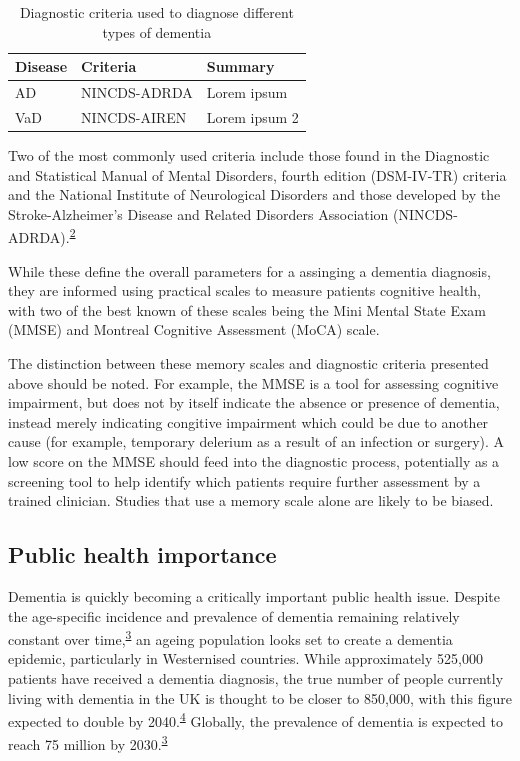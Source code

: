 \documentclass[a4paper, twoside]{templates/ociamthesis}
\begin{document}
\begin{table}[!h]

\caption{\label{tab:diagnosticCriteria-table}Diagnostic criteria used to diagnose different types of dementia}
\centering
\begin{tabular}[t]{lll}
\toprule
Disease & Criteria & Summary\\
\midrule
AD & NINCDS-ADRDA & Lorem ipsum\\
VaD & NINCDS-AIREN & Lorem ipsum 2\\
\bottomrule
\end{tabular}
\end{table}

Two of the most commonly used criteria include those found in the Diagnostic and Statistical Manual of Mental Disorders, fourth edition (DSM-IV-TR) criteria and the National Institute of Neurological Disorders and those developed by the Stroke-Alzheimer's Disease and Related Disorders Association (NINCDS-ADRDA).\textsuperscript{\protect\hyperlink{ref-dubois2007}{2}}

While these define the overall parameters for a assinging a dementia diagnosis, they are informed using practical scales to measure patients cognitive health, with two of the best known of these scales being the Mini Mental State Exam (MMSE) and Montreal Cognitive Assessment (MoCA) scale.

The distinction between these memory scales and diagnostic criteria presented above should be noted. For example, the MMSE is a tool for assessing cognitive impairment, but does not by itself indicate the absence or presence of dementia, instead merely indicating congitive impairment which could be due to another cause (for example, temporary delerium as a result of an infection or surgery).
A low score on the MMSE should feed into the diagnostic process, potentially as a screening tool to help identify which patients require further assessment by a trained clinician. Studies that use a memory scale alone are likely to be biased.

\hypertarget{public-health-importance}{%
\subsection{Public health importance}\label{public-health-importance}}

Dementia is quickly becoming a critically important public health issue. Despite the age-specific incidence and prevalence of dementia remaining relatively constant over time,\textsuperscript{\protect\hyperlink{ref-prince2016}{3}} an ageing population looks set to create a dementia epidemic, particularly in Westernised countries. While approximately 525,000 patients have received a dementia diagnosis, the true number of people currently living with dementia in the UK is thought to be closer to 850,000, with this figure expected to double by 2040.\textsuperscript{\protect\hyperlink{ref-baker2019}{4}} Globally, the prevalence of dementia is expected to reach 75 million by 2030.\textsuperscript{\protect\hyperlink{ref-prince2016}{3}}
\end{document}
